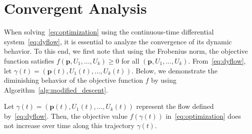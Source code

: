 \documentclass[onefignum,onetabnum]{siamart220329}
\begin{document}
    
    
    
    \section{Convergent Analysis}
    When solving~\eqref{eq:optimization} using the continuous-time differential system~\eqref{eq:dyflow}, it is essential to analyze the convergence of its dynamic behavior.
    To this end, we first note that using the Frobenius norm, the objective function satisfies $f(\mathbf{p}, U_1, \ldots, U_k) \geq 0$ for all $(\mathbf{p}, U_1, \ldots, U_k)$.
    From~\eqref{eq:dyflow}, let $\gamma(t) = (\mathbf{p}(t), U_1(t), \ldots, U_k(t))$. Below, we demonstrate the diminishing behavior of the objective function $f$ by using Algorithm~\ref{alg:modified_descent}.
    \begin{theorem}\label{thm:conv}
    Let $\gamma(t) = (\mathbf{p}(t), U_1(t), \ldots, U_k(t))$ represent the flow defined by~\eqref{eq:dyflow}. Then, the objective value $f(\gamma(t))$ in~\eqref{eq:optimization} does not increase over time along this trajectory $\gamma(t)$.
     \end{theorem}
\end{document}
